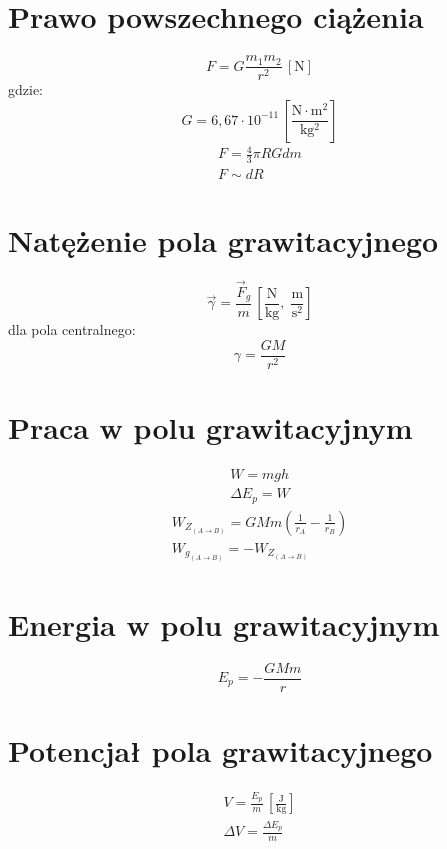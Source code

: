 \documentclass{report}
\numberwithin{equation}{chapter}
\newcommand{\unit}[1]{\,\left[\mathrm{#1}\right]}
\begin{document}
    \section{Prawo powszechnego ciążenia}
      \begin{equation}
        F = G\frac{m_1m_2}{r^2} \unit{N}
      \end{equation}
      gdzie:
      \begin{equation}
        G = 6,67\cdot 10^{-11} \unit{\frac{N\cdot m^2}{kg^2}}
      \end{equation}
      \begin{gather}
        F = \frac{4}{3}\pi RGdm\\
        F \sim dR
      \end{gather}
    \section{Natężenie pola grawitacyjnego}
      \begin{equation}
        \vec\gamma = \frac{\vec F_g}{m} \unit{\frac{N}{kg},\;\frac{m}{s^2}}
      \end{equation}
      dla pola centralnego:
      \begin{equation}
        \gamma = \frac{GM}{r^2}
      \end{equation}
    \section{Praca w polu grawitacyjnym}
      \begin{gather}
        W = mgh\\
        \Delta E_p = W
      \end{gather}
      \begin{gather}
        W_{Z_{(A\rightarrow B)}} = GMm\left(\frac{1}{r_A} - \frac{1}{r_B}\right)\\
        W_{g_{(A\rightarrow B)}} = -W_{Z_{(A\rightarrow B)}}
      \end{gather}
    \section{Energia w polu grawitacyjnym}
      \begin{equation}
        E_p = -\frac{GMm}{r}
      \end{equation}
    \section{Potencjał pola grawitacyjnego}
      \begin{gather}
        V = \frac{E_p}{m} \unit{\frac{J}{kg}}\\
        \Delta V = \frac{\Delta E_p}{m}
      \end{gather}
\end{document}
